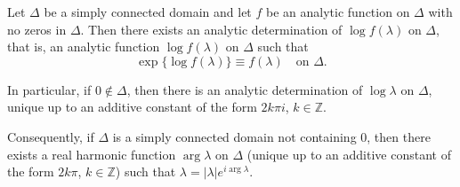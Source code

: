 Let $\Delta$ be a simply connected domain and let $f$ be an analytic function on $\Delta$ with no zeros in $\Delta$. Then there exists an analytic determination of $\log f(\lambda)$ on $\Delta$, that is, an analytic function $\log f(\lambda)$ on $\Delta$ such that
$$\exp\{\log f(\lambda)\} \equiv f(\lambda) \quad \text{on } \Delta.$$

In particular, if $0 \notin \Delta$, then there is an analytic determination of $\log \lambda$ on $\Delta$, unique up to an additive constant of the form $2k\pi i$, $k \in \mathbb{Z}$.

Consequently, if $\Delta$ is a simply connected domain not containing $0$, then there exists a real harmonic function $\arg \lambda$ on $\Delta$ (unique up to an additive constant of the form $2k\pi$, $k \in \mathbb{Z}$) such that $\lambda = |\lambda| e^{i \arg \lambda}$.
